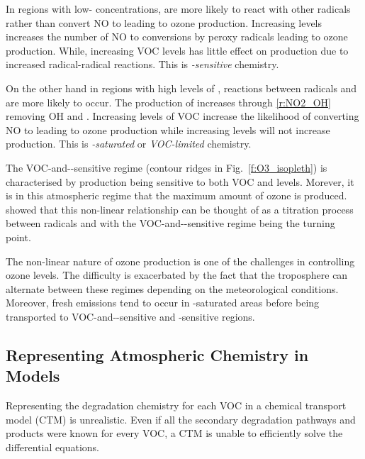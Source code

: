In regions with low- concentrations,  are more likely to react with other radicals rather than convert NO to  leading to ozone production.
Increasing  levels increases the number of NO to  conversions by peroxy radicals leading to ozone production.
While, increasing VOC levels has little effect on  production due to increased radical-radical reactions.
This is \emph{-sensitive} chemistry.  

On the other hand in regions with high levels of , reactions between radicals and  are more likely to occur.
The production of  increases through \eqref{r:NO2_OH} removing OH and .
Increasing levels of VOC increase the likelihood of  converting NO to  leading to ozone production while increasing  levels will not increase  production.  
This is \emph{-saturated} or \emph{VOC-limited} chemistry.

The VOC-and--sensitive regime (contour ridges in Fig.~\ref{f:O3_isopleth}) is characterised by  production being sensitive to both VOC and  levels. 
Morever, it is in this atmospheric regime that the maximum amount of ozone is produced.
\citet{Kleinman:1994} showed that this non-linear relationship can be thought of as a titration process between radicals and  with the VOC-and--sensitive regime being the turning point.

The non-linear nature of ozone production is one of the challenges in controlling ozone levels.
The difficulty is exacerbated by the fact that the troposphere can alternate between these regimes depending on the meteorological conditions.
Moreover, fresh emissions tend to occur in -saturated areas before being transported to VOC-and--sensitive and -sensitive regions.

\subsection{Representing Atmospheric Chemistry in Models} \label{ss:chemistry_models}
Representing the degradation chemistry for each VOC in a chemical transport model (CTM) is unrealistic.
Even if all the secondary degradation pathways and products were known for every VOC, a CTM is unable to efficiently solve the differential equations.

